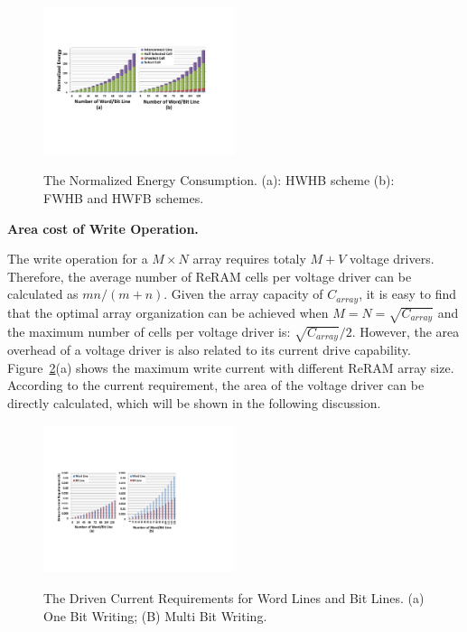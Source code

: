 \begin{figure}%
\centering
  \includegraphics[width=0.5\textwidth]{./figures/energy4.pdf}\\
  \caption{The Normalized Energy Consumption. (a): HWHB scheme (b): FWHB and HWFB schemes.}\label{fig:energy}
    \vspace{-10pt}
\end{figure}

\vspace{6pt} \textbf{Area cost of Write Operation.} \vspace{6pt}

The write operation for a $M \times N$ array requires totaly $M+V$ voltage drivers. Therefore, the average number of ReRAM cells per voltage driver can be calculated as $mn/(m+n)$. Given the array capacity of $C_{array}$, it is easy to find that the optimal array organization can be achieved when $M=N=\sqrt{C_{array}}$ and the maximum number of cells per voltage driver is: $\sqrt{C_{array}}/2$. However, the area overhead of a voltage driver is also related to its current drive capability. Figure~\ref{fig:drive_i}(a) shows the maximum write current with different ReRAM array size. According to the current requirement, the area of the voltage driver can be directly calculated, which will be shown in the following discussion.

\begin{figure}%
\centering
  \includegraphics[width=0.5\textwidth]{./figures/drive_i_double.pdf}\\
  \caption{The Driven Current Requirements for Word Lines and Bit Lines. (a) One Bit Writing; (B) Multi Bit Writing.}\label{fig:drive_i}
\end{figure}


